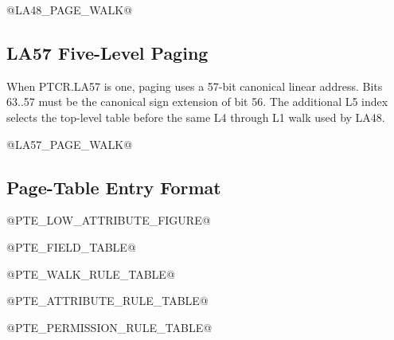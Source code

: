 @LA48_PAGE_WALK@


\clearpage
\subsection{LA57 Five-Level Paging}
When PTCR.LA57 is one, paging uses a 57-bit canonical linear address. Bits
63..57 must be the canonical sign extension of bit 56. The additional L5 index
selects the top-level table before the same L4 through L1 walk used by LA48.

@LA57_PAGE_WALK@


\clearpage
\subsection{Page-Table Entry Format}
@PTE_LOW_ATTRIBUTE_FIGURE@


@PTE_FIELD_TABLE@

@PTE_WALK_RULE_TABLE@

@PTE_ATTRIBUTE_RULE_TABLE@

@PTE_PERMISSION_RULE_TABLE@
